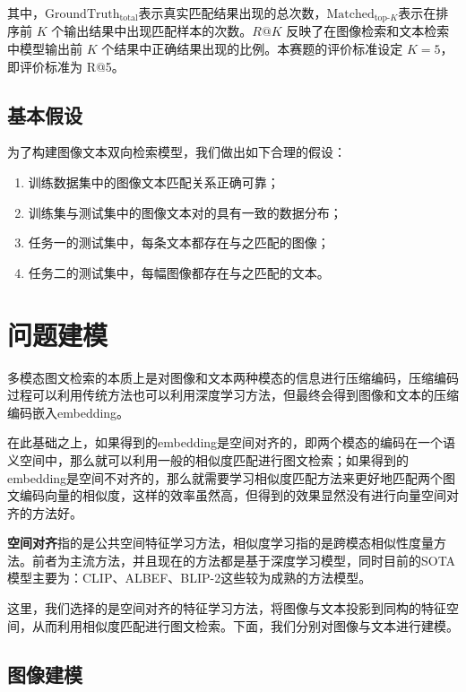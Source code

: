 \documentclass[a4paper]{zreport}
\begin{document}
其中，$\mathrm{GroundTruth}_{\text{total}}$表示真实匹配结果出现的总次数，$\mathrm{Matched}_{\text{top-}K}$表示在排序前 $K$ 个输出结果中出现匹配样本的次数。$R@K$ 反映了在图像检索和文本检索中模型输出前 $K$ 个结果中正确结果出现的比例。本赛题的评价标准设定 $K=5$，即评价标准为 R@5。

\subsection{基本假设}

为了构建图像文本双向检索模型，我们做出如下合理的假设：

\begin{enumerate}
\item 训练数据集中的图像文本匹配关系正确可靠；
\item 训练集与测试集中的图像文本对的具有一致的数据分布；
\item 任务一的测试集中，每条文本都存在与之匹配的图像；
\item 任务二的测试集中，每幅图像都存在与之匹配的文本。
\end{enumerate}

\newpage

\section{问题建模} \label{modeling}

多模态图文检索的本质上是对图像和文本两种模态的信息进行压缩编码，压缩编码过程可以利用传统方法也可以利用深度学习方法，但最终会得到图像和文本的压缩编码嵌入embedding。

在此基础之上，如果得到的embedding是空间对齐的，即两个模态的编码在一个语义空间中，那么就可以利用一般的相似度匹配进行图文检索；如果得到的embedding是空间不对齐的，那么就需要学习相似度匹配方法来更好地匹配两个图文编码向量的相似度，这样的效率虽然高，但得到的效果显然没有进行向量空间对齐的方法好。

\textbf{空间对齐}指的是公共空间特征学习方法，相似度学习指的是跨模态相似性度量方法。前者为主流方法，并且现在的方法都是基于深度学习模型，同时目前的SOTA模型主要为：CLIP、ALBEF、BLIP-2这些较为成熟的方法模型。

这里，我们选择的是空间对齐的特征学习方法，将图像与文本投影到同构的特征空间，从而利用相似度匹配进行图文检索。下面，我们分别对图像与文本进行建模。

\subsection{图像建模}
\end{document}
